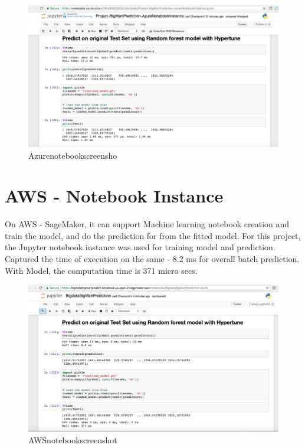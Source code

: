 \begin{figure}[pic9]
\centering\includegraphics[width=\columnwidth]{Images/Azurenotebookscreenshot.png}
	\caption{Azurenotebookscreensho}\label{fig:Azurenotebookscreensho}
\end{figure}

\section{AWS - Notebook Instance}

On AWS - SageMaker, it can support Machine learning notebook creation and 
train the model, and do the prediction for from the fitted model. For this 
project, the Jupyter notebook instance was used for training model and 
prediction. Captured the time of execution on the same - 8.2 ms for overall 
batch prediction. With Model, the computation time is 371 micro secs.

\begin{figure}[pic10]
	\centering\includegraphics[width=\columnwidth]{Images/AWSnotebookscreenshot.png}
	\caption{AWSnotebookscreenshot}\label{fig:AWSnotebookscreenshot}
\end{figure}

